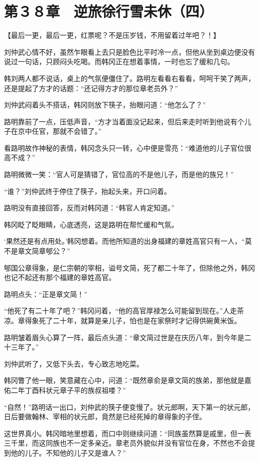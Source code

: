 \section{第３８章　逆旅徐行雪未休（四）}

【最后一更，最后一更，红票呢？不是压岁钱，不用留着过年吧？！】

刘仲武心情不好，虽然乍眼看上去只是脸色比平时冷一点，但他从坐到桌边便没有说过一句话，只顾闷头吃喝。而韩冈正在想着事情，一时也忘了缓和几句。

韩刘两人都不说话，桌上的气氛便僵住了。路明左看看右看看，呵呵干笑了两声，还是提起了方才的话题：“还记得方才的那位章老员外？”

刘仲武闷着头不搭话，韩冈则放下筷子，抬眼问道：“他怎么了？”

路明靠前了一点，压低声音，“方才当着面没记起来，但后来走时听到他说有个儿子在京中任官，那就不会错了。”

看路明故作神秘的表情，韩冈念头只一转，心中便是雪亮：“难道他的儿子官位很高不成？”

路明微微一笑：“官人可是猜错了，官位高的不是他儿子，而是他的族兄！”

“谁？”刘仲武终于停住了筷子，抬起头来，开口问着。

路明没有直接回答，反而对韩冈道：“韩官人肯定知道。”

韩冈眨了眨眼睛，心底透亮，这是路明在帮忙缓和气氛。

‘果然还是有点用处。’韩冈想着。而他所知道的出身福建的章姓高官只有一人，“莫不是章文简章郇公？”

郇国公章得象，是仁宗朝的宰相，谥号文简，死了都二十年了，但除他之外，韩冈也记不起还有那个福建的章姓高官。

路明点头：“正是章文简！”

“他死了有二十年了吧？”韩冈问着，“他的高官厚禄怎么可能留到现在。”人走茶凉。章得象死了二十年，就算是亲儿子，怕也是在家祭时才记得供碗黄米饭。

路明皱着眉头心算了一阵，最后点头道：“章文简过世是在庆历八年，到今年是二十三年了。”

刘仲武听了，又低下头去，专心致志地吃菜。

韩冈瞥了他一眼，笑意藏在心中，问道：“既然章俞是章文简的族弟，那他就是嘉佑二年丁酉科状元章子平的族叔祖喽？”

“自然！”路明话一出口，刘仲武的筷子便变慢了。状元郎啊，天下第一的状元郎，日后要做翰林、宰相的状元郎，竟然是已经死掉的章得象的子侄。

这世界真小。韩冈暗地里想着，而口中则继续问道：“同族虽然算是戚里，但一表三千里，而这同族也不一定多亲近。章老员外貌似并没有官位在身，不然也不会提到他的儿子。不知他的儿子又是谁人？”

